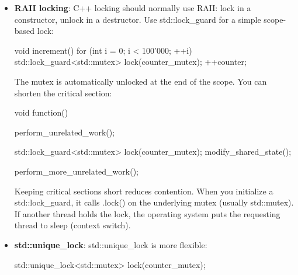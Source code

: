 \documentclass{report}
\begin{document}
\begin{itemize}
\begin{cppcode}
                void increment()
                {
                    for (int i = 0; i < 100'000; ++i) {
                        counter_mutex.lock();
                        ++counter;
                        counter_mutex.unlock();
                    }
                }
            \end{cppcode}
            \bigbreak \noindent 
            The protected region is called a critical section. Do not normally call lock() and unlock() manually. If an exception or early return occurs before unlock(), the mutex remains locked
        \item \textbf{RAII locking}: C++ locking should normally use RAII: lock in a constructor, unlock in a destructor.
            \bigbreak \noindent 
            Use std::lock\_guard for a simple scope-based lock:
            \bigbreak \noindent 
            \begin{cppcode}
                void increment() {
                    for (int i = 0; i < 100'000; ++i) {
                        std::lock_guard<std::mutex> lock(counter_mutex);
                        ++counter;
                    }
                }
            \end{cppcode}
            \bigbreak \noindent 
            The mutex is automatically unlocked at the end of the scope.
            \bigbreak \noindent 
            You can shorten the critical section:
            \bigbreak \noindent 
            \begin{cppcode}
                void function() {
                    perform_unrelated_work();

                    {
                        std::lock_guard<std::mutex> lock(counter_mutex);
                        modify_shared_state();
                    }

                    perform_more_unrelated_work();
                }
            \end{cppcode}
            \bigbreak \noindent 
            Keeping critical sections short reduces contention.
            \bigbreak \noindent 
            When you initialize a std::lock\_guard, it calls .lock() on the underlying mutex (usually std::mutex). If another thread holds the lock, the operating system puts the requesting thread to sleep (context switch).
        \item \textbf{std::unique\_lock}: std::unique\_lock is more flexible:
            \bigbreak \noindent 
            \begin{cppcode}
                std::unique_lock<std::mutex> lock(counter_mutex);


\end{cppcode}
\end{itemize}
\end{document}
